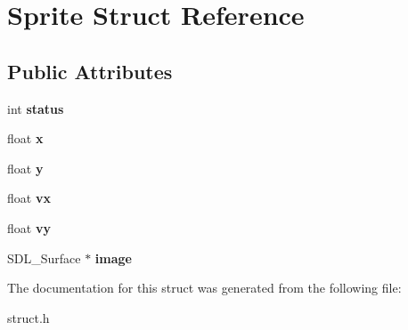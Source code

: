 \hypertarget{structSprite}{}\section{Sprite Struct Reference}
\label{structSprite}
\subsection*{Public Attributes}
\begin{DoxyCompactItemize}
\item 
int {\bfseries status}\hypertarget{structSprite_a2500f95508a713c1ce20b2f09ec652da}{}\label{structSprite_a2500f95508a713c1ce20b2f09ec652da}

\item 
float {\bfseries x}\hypertarget{structSprite_ad5222d1d6d41088ab80cf7e096461799}{}\label{structSprite_ad5222d1d6d41088ab80cf7e096461799}

\item 
float {\bfseries y}\hypertarget{structSprite_ad09503279ec7c1b96bf67566a917e183}{}\label{structSprite_ad09503279ec7c1b96bf67566a917e183}

\item 
float {\bfseries vx}\hypertarget{structSprite_ae654b5c98a01bb8044609e792f8fab1b}{}\label{structSprite_ae654b5c98a01bb8044609e792f8fab1b}

\item 
float {\bfseries vy}\hypertarget{structSprite_a37bb959256da6b84fed64a3787fc9840}{}\label{structSprite_a37bb959256da6b84fed64a3787fc9840}

\item 
S\+D\+L\+\_\+\+Surface $\ast$ {\bfseries image}\hypertarget{structSprite_a80402c358e003c422aa75bec2b6d0099}{}\label{structSprite_a80402c358e003c422aa75bec2b6d0099}

\end{DoxyCompactItemize}


The documentation for this struct was generated from the following file\+:\begin{DoxyCompactItemize}
\item 
struct.\+h\end{DoxyCompactItemize}
